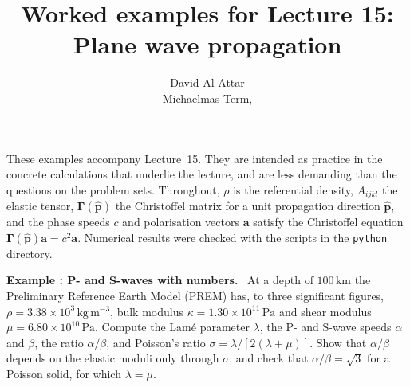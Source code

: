 \documentclass[a4paper,12pt]{paper}
\title{Worked examples for Lecture 15: Plane wave propagation}
\author{David Al-Attar \\ Michaelmas Term, \the\year}
\newcounter{example}
\renewenvironment{example}[1]{%
  \refstepcounter{example}%
  \begin{mdframed}[linewidth=1pt,innertopmargin=6pt,innerbottommargin=6pt]%
  \noindent\textbf{Example \theexample: #1.}\ }{%
  \end{mdframed}}
\begin{document}
\maketitle

\noindent These examples accompany Lecture~15. They are intended as practice in the concrete
calculations that underlie the lecture, and are less demanding than the questions on the
problem sets. Throughout, $\rho$ is the referential density, $A_{ijkl}$ the elastic tensor,
$\bm{\Gamma}(\hat{\mathbf{p}})$ the Christoffel matrix for a unit propagation direction
$\hat{\mathbf{p}}$, and the phase speeds $c$ and polarisation vectors $\mathbf{a}$ satisfy the
Christoffel equation $\bm{\Gamma}(\hat{\mathbf{p}})\mathbf{a}=c^{2}\mathbf{a}$. Numerical results
were checked with the scripts in the \texttt{python} directory.

\begin{example}{P- and S-waves with numbers}
At a depth of $100\,\mathrm{km}$ the Preliminary Reference Earth Model (PREM) has, to three
significant figures, $\rho=3.38\times10^{3}\,\mathrm{kg\,m^{-3}}$, bulk modulus
$\kappa=1.30\times10^{11}\,\mathrm{Pa}$ and shear modulus $\mu=6.80\times10^{10}\,\mathrm{Pa}$.
Compute the Lamé parameter $\lambda$, the P- and S-wave speeds $\alpha$ and $\beta$, the ratio
$\alpha/\beta$, and Poisson's ratio $\sigma=\lambda/[2(\lambda+\mu)]$. Show that $\alpha/\beta$
depends on the elastic moduli only through $\sigma$, and check that
$\alpha/\beta=\sqrt{3}$ for a Poisson solid, for which $\lambda=\mu$.
\end{example}
\end{document}
